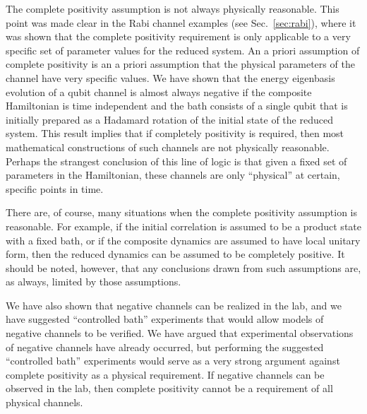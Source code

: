 The complete positivity assumption is not always physically reasonable.  This point was made clear in the Rabi channel examples (see Sec.\ \ref{sec:rabi}), where it was shown that the complete positivity requirement is only applicable to a very specific set of parameter values for the reduced system.  An a priori assumption of complete positivity is an a priori assumption that the physical parameters of the channel have very specific values.  We have shown that the energy eigenbasis evolution of a qubit channel is almost always negative if the composite Hamiltonian is time independent and the bath consists of a single qubit that is initially prepared as a Hadamard rotation of the initial state of the reduced system.  This result implies that if completely positivity is required, then most mathematical constructions of such channels are not physically reasonable.  Perhaps the strangest conclusion of this line of logic is that given a fixed set of parameters in the Hamiltonian, these channels are only ``physical'' at certain, specific points in time.

There are, of course, many situations when the complete positivity assumption is reasonable.  For example, if the initial correlation is assumed to be a product state with a fixed bath, or if the composite dynamics are assumed to have local unitary form, then the reduced dynamics can be assumed to be completely positive.  It should be noted, however, that any conclusions drawn from such assumptions are, as always, limited by those assumptions. 

We have also shown that negative channels can be realized in the lab, and we have suggested ``controlled bath'' experiments that would allow models of negative channels to be verified.  We have argued that experimental observations of negative channels have already occurred, but performing the suggested ``controlled bath'' experiments would serve as a very strong argument against complete positivity as a physical requirement.  If negative channels can be observed in the lab, then complete positivity cannot be a requirement of all physical channels.  

